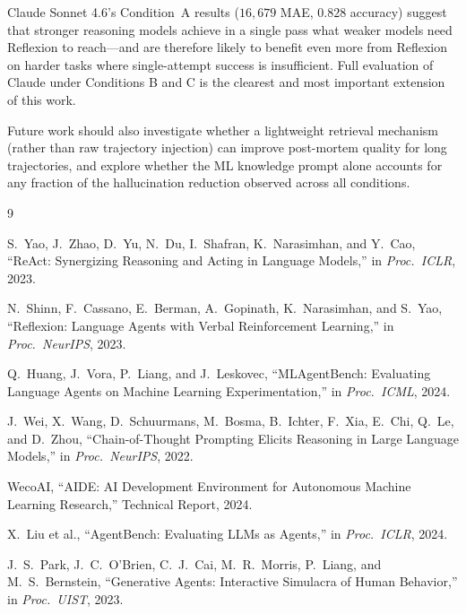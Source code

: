 \documentclass[conference]{IEEEtran}
\begin{document}
Claude Sonnet 4.6's Condition~A results ($16{,}679$ MAE, $0.828$ accuracy)
suggest that stronger reasoning models achieve in a single pass what weaker
models need Reflexion to reach---and are therefore likely to benefit even more
from Reflexion on harder tasks where single-attempt success is insufficient.
Full evaluation of Claude under Conditions B and C is the clearest and most
important extension of this work.

Future work should also investigate whether a lightweight retrieval mechanism
(rather than raw trajectory injection) can improve post-mortem quality for
long trajectories, and explore whether the ML knowledge prompt alone accounts
for any fraction of the hallucination reduction observed across all conditions.


\begin{thebibliography}{9}

S.~Yao, J.~Zhao, D.~Yu, N.~Du, I.~Shafran, K.~Narasimhan, and Y.~Cao,
``ReAct: Synergizing Reasoning and Acting in Language Models,''
in \textit{Proc.\ ICLR}, 2023.

N.~Shinn, F.~Cassano, E.~Berman, A.~Gopinath, K.~Narasimhan, and
S.~Yao, ``Reflexion: Language Agents with Verbal Reinforcement Learning,''
in \textit{Proc.\ NeurIPS}, 2023.

Q.~Huang, J.~Vora, P.~Liang, and J.~Leskovec,
``MLAgentBench: Evaluating Language Agents on Machine Learning Experimentation,''
in \textit{Proc.\ ICML}, 2024.

J.~Wei, X.~Wang, D.~Schuurmans, M.~Bosma, B.~Ichter, F.~Xia, E.~Chi,
Q.~Le, and D.~Zhou, ``Chain-of-Thought Prompting Elicits Reasoning in Large
Language Models,'' in \textit{Proc.\ NeurIPS}, 2022.

WecoAI, ``AIDE: AI Development Environment for Autonomous Machine Learning
Research,'' Technical Report, 2024.

X.~Liu et al.,
``AgentBench: Evaluating LLMs as Agents,''
in \textit{Proc.\ ICLR}, 2024.

J.~S.~Park, J.~C.~O'Brien, C.~J.~Cai, M.~R.~Morris, P.~Liang, and
M.~S.~Bernstein, ``Generative Agents: Interactive Simulacra of Human Behavior,''
in \textit{Proc.\ UIST}, 2023.

\end{thebibliography}
\end{document}
